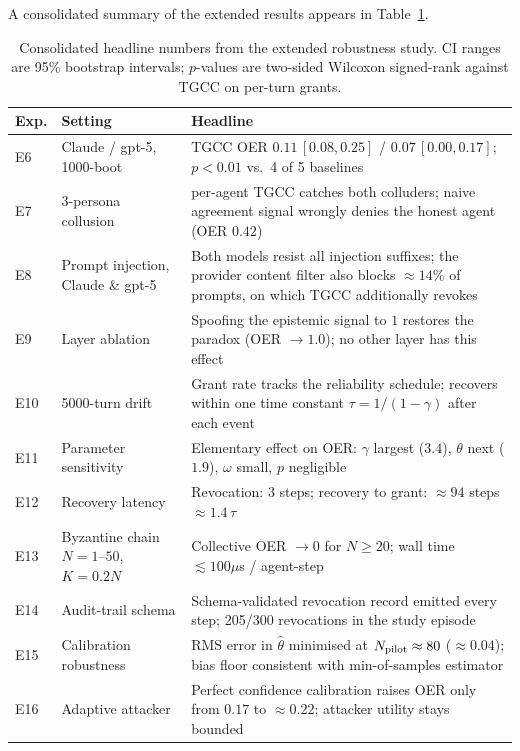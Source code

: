 \documentclass[sigconf,anonymous]{acmart}
\theoremstyle{plain}
\theoremstyle{definition}
\theoremstyle{remark}
\begin{document}
A consolidated summary of the extended results appears in
Table~\ref{tab:ext_summary}.

\begin{table}[t]
\caption{Consolidated headline numbers from the extended robustness study.
CI ranges are 95\% bootstrap intervals; $p$-values are two-sided Wilcoxon
signed-rank against TGCC on per-turn grants.}
\label{tab:ext_summary}
\centering\footnotesize\renewcommand{\arraystretch}{1.22}
\begin{tabular}{p{0.7cm} p{2.5cm} p{4.2cm}}
\toprule
\rowcolor{headrow}
{\color{white}\textbf{Exp.}} & {\color{white}\textbf{Setting}} &
{\color{white}\textbf{Headline}}\\
\midrule
\rowcolor{oursrow}
E6 & Claude / gpt-5, 1000-boot & TGCC OER $0.11\,[0.08,0.25]$ /
    $0.07\,[0.00,0.17]$;  $p<0.01$ vs.\ 4 of 5 baselines\\
E7 & 3-persona collusion & per-agent TGCC catches both colluders; naive
    agreement signal wrongly denies the honest agent (OER $0.42$)\\
\rowcolor{oursrow}
E8 & Prompt injection, Claude \& gpt-5 & Both models resist all
    injection suffixes; the provider content filter also blocks
    $\approx14\%$ of prompts, on which TGCC additionally revokes\\
E9 & Layer ablation & Spoofing the epistemic signal to $1$ restores
    the paradox (OER $\to 1.0$); no other layer has this effect\\
\rowcolor{oursrow}
E10 & 5000-turn drift & Grant rate tracks the reliability schedule;
    recovers within one time constant $\tau=1/(1-\gamma)$ after
    each event\\
E11 & Parameter sensitivity & Elementary effect on OER: $\gamma$ largest
    ($3.4$), $\theta$ next ($1.9$), $\omega$ small, $p$ negligible\\
\rowcolor{oursrow}
E12 & Recovery latency & Revocation: 3 steps; recovery to grant:
    $\approx 94$ steps $\approx 1.4\,\tau$\\
E13 & Byzantine chain $N{=}1$--$50$, $K{=}0.2N$ &
    Collective OER $\to 0$ for $N\ge20$; wall time $\lesssim 100\mu$s /
    agent-step\\
\rowcolor{oursrow}
E14 & Audit-trail schema & Schema-validated revocation record emitted
    every step; 205/300 revocations in the study episode\\
E15 & Calibration robustness & RMS error in $\hat\theta$ minimised at
    $N_{\rm pilot}\approx 80$ ($\approx 0.04$); bias floor consistent
    with min-of-samples estimator\\
\rowcolor{oursrow}
E16 & Adaptive attacker & Perfect confidence calibration raises OER
    only from $0.17$ to $\approx 0.22$; attacker utility stays bounded\\
\bottomrule
\end{tabular}
\end{table}
\end{document}
